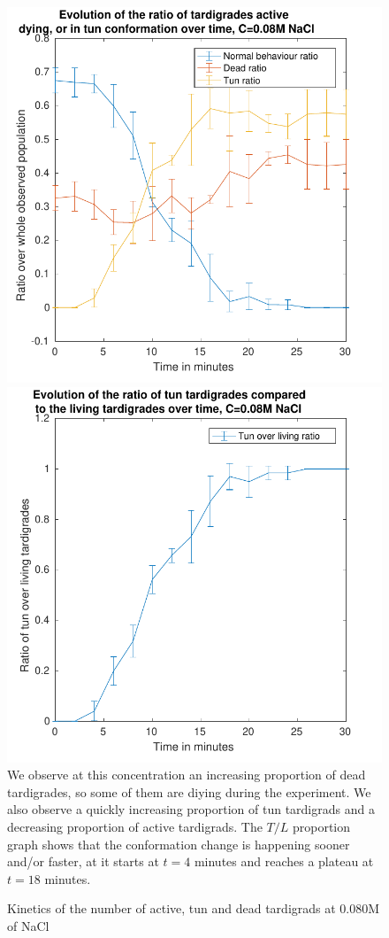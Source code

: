 \documentclass[12pt,a4paper, twocolumn]{article}
\begin{document}
\begin{figure}
\includegraphics[width=\linewidth]{008.pdf}
\includegraphics[width=\linewidth]{008t.pdf}
\label{fig008}
We observe at this concentration an increasing proportion of dead tardigrades, so some of them are diying during the experiment. We also observe a quickly increasing proportion of tun tardigrads and a decreasing proportion of active tardigrads. The $T/L$ proportion graph shows that the conformation change is happening sooner and/or faster, at it starts at $t=4$ minutes and reaches a plateau at $t=18$ minutes.
\caption{Kinetics of the number of active, tun and dead tardigrads at 0.080M of NaCl}
\end{figure}
\end{document}
